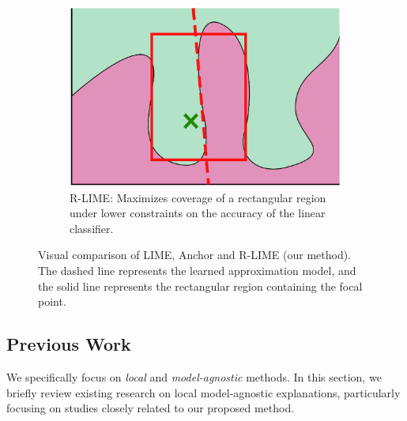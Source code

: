 \documentclass[11pt]{article}
\begin{document}
\begin{figure}[tbp]
\begin{subfigure}[t]{0.3\textwidth}
  \end{subfigure}
  \hspace{0.03\textwidth}
  \begin{subfigure}[t]{0.3\textwidth}
    \centering
    \includegraphics[width=\textwidth]{visual-rlime3}
    \caption{%
      R-LIME:
      Maximizes coverage of a rectangular region
      under lower constraints on the accuracy of the linear classifier.
    }\label{fig:rlime}
  \end{subfigure}
  \caption[Visual comparison of LIME, Anchor and R-LIME]{%
    Visual comparison of LIME, Anchor and R-LIME (our method).
    The dashed line represents the learned approximation model,
    and the solid line represents the rectangular region containing the focal point.
  }
\end{figure}

\subsection{Previous Work}
We specifically focus on \emph{local} and \emph{model-agnostic} methods.
In this section,
we briefly review existing research on local model-agnostic explanations,
particularly focusing on studies closely related to our proposed method.
\end{document}
